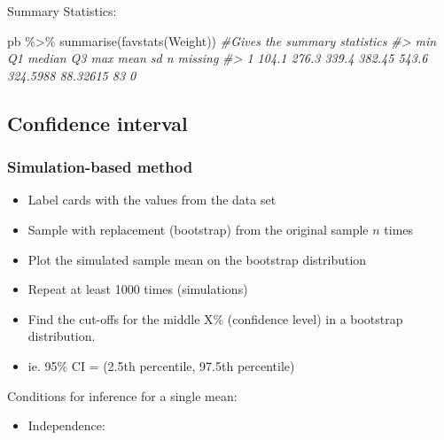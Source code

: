 \documentclass[
]{report}
\newenvironment{Shaded}{\begin{snugshade}}{\end{snugshade}}
\newcommand{\CommentTok}[1]{\textcolor[rgb]{0.56,0.35,0.01}{\textit{#1}}}
\newcommand{\FunctionTok}[1]{\textcolor[rgb]{0.00,0.00,0.00}{#1}}
\newcommand{\NormalTok}[1]{#1}
\newcommand{\SpecialCharTok}[1]{\textcolor[rgb]{0.00,0.00,0.00}{#1}}
\providecommand{\tightlist}{%
  \setlength{\itemsep}{0pt}\setlength{\parskip}{0pt}}
\begin{document}
Summary Statistics:

\begin{Shaded}
\begin{Highlighting}[]
\NormalTok{pb }\SpecialCharTok{\%\textgreater{}\%}
  \FunctionTok{summarise}\NormalTok{(}\FunctionTok{favstats}\NormalTok{(Weight)) }\CommentTok{\#Gives the summary statistics}
\CommentTok{\#\textgreater{}     min    Q1 median     Q3   max     mean       sd  n missing}
\CommentTok{\#\textgreater{} 1 104.1 276.3  339.4 382.45 543.6 324.5988 88.32615 83       0}
\end{Highlighting}
\end{Shaded}

\hypertarget{confidence-interval-1}{%
\subsection*{Confidence interval}\label{confidence-interval-1}}

\hypertarget{simulation-based-method-2}{%
\subsubsection*{Simulation-based method}\label{simulation-based-method-2}}

\begin{itemize}
\item
  Label cards with the values from the data set
\item
  Sample with replacement (bootstrap) from the original sample \(n\) times
\item
  Plot the simulated sample mean on the bootstrap distribution
\item
  Repeat at least 1000 times (simulations)
\item
  Find the cut-offs for the middle X\% (confidence level) in a bootstrap distribution.
\item
  ie. 95\% CI = (2.5th percentile, 97.5th percentile)
\end{itemize}

Conditions for inference for a single mean:

\begin{itemize}
\tightlist
\item
  Independence:
\end{itemize}

\vspace{0.5in}
\end{document}
